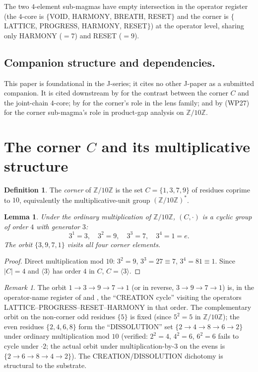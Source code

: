 \documentclass[11pt,reqno]{amsart}
\theoremstyle{plain}
\newtheorem{lemma}[theorem]{Lemma}
\theoremstyle{definition}
\newtheorem{definition}[theorem]{Definition}
\theoremstyle{remark}
\newtheorem*{remark}{Remark}
\newcommand{\Z}{\mathbb{Z}}
\begin{document}
The two $4$-element sub-magmas have empty intersection in the operator
register (the $4$-core is $\{$VOID, HARMONY, BREATH, RESET$\}$ and the
corner is $\{$LATTICE, PROGRESS, HARMONY, RESET$\}$) at the operator
level, sharing only HARMONY ($=7$) and RESET ($=9$).

\subsection{Companion structure and dependencies.}
This paper is foundational in the J-series; it cites no other
J-paper as a submitted companion. It is cited downstream by
\cite{SandersGishFourCore} for the contrast between the corner $C$
and the joint-chain $4$-core; by \cite{SandersGishThreeSubstrate} for
the corner's role in the lens family; and by
\cite{SandersGishProductGap} (WP27) for the corner sub-magma's role in
product-gap analysis on $\Z/10\Z$.

\section{The corner $C$ and its multiplicative structure}
\label{sec:units}

\begin{definition}\label{def:corner}
The \emph{corner} of $\Z/10\Z$ is the set
$C = \{1, 3, 7, 9\}$ of residues coprime to $10$, equivalently the
multiplicative-unit group $(\Z/10\Z)^*$.
\end{definition}

\begin{lemma}\label{lem:cyclic}
Under the ordinary multiplication of $\Z/10\Z$,
$(C, \cdot)$ is a cyclic group of order $4$ with generator $3$:
\[
3^1 = 3, \quad 3^2 = 9, \quad 3^3 = 7, \quad 3^4 = 1 = e.
\]
The orbit $\{3, 9, 7, 1\}$ visits all four corner elements.
\end{lemma}

\begin{proof}
Direct multiplication mod $10$:
$3^2 = 9$, $3^3 = 27 \equiv 7$, $3^4 = 81 \equiv 1$.
Since $|C| = 4$ and $\langle 3 \rangle$ has order $4$ in $C$,
$C = \langle 3 \rangle$.
\end{proof}

\begin{remark}\label{rem:creation}
The orbit $1 \to 3 \to 9 \to 7 \to 1$ (or in reverse,
$3 \to 9 \to 7 \to 1$) is, in the operator-name register of
\cite{SandersForcing} and \cite{SandersTIG}, the
``CREATION cycle'' visiting the operators
LATTICE--PROGRESS--RESET--HARMONY in that order. The complementary
orbit on the non-corner odd residues $\{5\}$ is fixed (since $5^2 = 5$
in $\Z/10\Z$); the even residues $\{2, 4, 6, 8\}$ form the
``DISSOLUTION'' set $\{2 \to 4 \to 8 \to 6 \to 2\}$ under ordinary
multiplication mod $10$ (verified: $2^2 = 4$, $4^2 = 6$, $6^2 = 6$
fails to cycle under $\cdot 2$; the actual orbit under
multiplication-by-$3$ on the evens is $\{2 \to 6 \to 8 \to 4 \to 2\}$).
The CREATION/DISSOLUTION dichotomy is structural to the substrate.
\end{remark}
\end{document}
